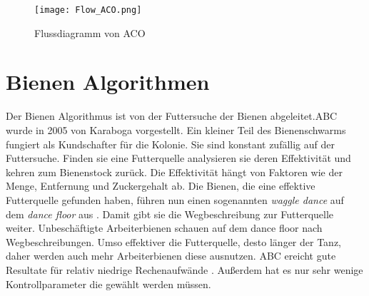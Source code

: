 \begin{figure}
  \centering
  \texttt{[image: Flow\_ACO.png]}
  \caption{Flussdiagramm von ACO}
  \label{fig:Figure_ACO}
\end{figure}

\section{Bienen Algorithmen}
Der Bienen Algorithmus ist von der Futtersuche der Bienen abgeleitet.ABC wurde in 2005 von Karaboga vorgestellt\cite{karaboga2005idea}. Ein kleiner Teil des Bienenschwarms fungiert als Kundschafter für die Kolonie.
Sie sind konstant zufällig auf der Futtersuche. Finden sie eine Futterquelle analysieren sie deren Effektivität und kehren zum Bienenstock zurück. Die Effektivität hängt von Faktoren wie der Menge, Entfernung und Zuckergehalt ab.\cite{PHAM2006454}
Die Bienen, die eine effektive Futterquelle gefunden haben, führen nun einen sogenannten \emph{waggle dance} auf dem \emph{dance floor} aus \cite{Seeley+1995}. Damit gibt sie die Wegbeschreibung zur Futterquelle weiter.
Unbeschäftigte Arbeiterbienen schauen auf dem dance floor nach Wegbeschreibungen. Umso effektiver die Futterquelle, desto länger der Tanz, daher werden auch mehr Arbeiterbienen diese ausnutzen.\cite{KARABOGA2009108} ABC ereicht gute Resultate für relativ niedrige Rechenaufwände \cite{karaboga2008performance}. Außerdem hat es nur sehr wenige Kontrollparameter die gewählt werden müssen.\\

